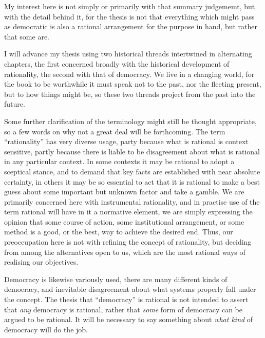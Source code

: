 My interest here is not simply or primarily with that summary judgememt, but with the detail behind it, for the thesis is not that everything which might pass as democratic is also a rational arrangement for the purpose in hand, but rather that some are.

I will advance my thesis using two historical threads intertwined in alternating chapters,
the first concerned broadly with the historical development of rationality, the second with that of democracy.
We live in a changing world, for the book to be worthwhile it must speak not to the past, nor the fleeting present, but to how things might be, so these two threads project from the past into the future.

Some further clarification of the terminology might still be thought appropriate, so a few words on why not a great deal will be forthcoming.
The term ``rationality'' has very diverse usage, party because what is rational is context sensitive, partly because there is liable to be disagreement about what is rational in any particular context.
In some contexts it may be rational to adopt a sceptical stance, and to demand that key facts are established with near absolute certainty, in others it may be so essential to act that it is rational to make a best guess about some important but unknown factor and take a gamble.
We are primarily concerned here with instrumental rationality, and in practise use of the term rational will have in it a normative element, we are simply expressing the opinion that some course of action, some institutional arrangement, or some method is a good, or the best, way to achieve the desired end.
Thus, our preoccupation here is not with refining the concept of rationality, but deciding from among the alternatives open to us, which are the most rational ways of realising our objectives.

Democracy is likewise variously used, there are many different kinds of democracy, and inevitable disagreement about what systems properly fall under the concept.
The thesis that ``democracy'' is rational is not intended to assert that \emph{any} democracy is rational, rather that \emph{some} form of democracy can be argued to be rational.
It will be necessary to say something about \emph{what kind} of democracy will do the job.



